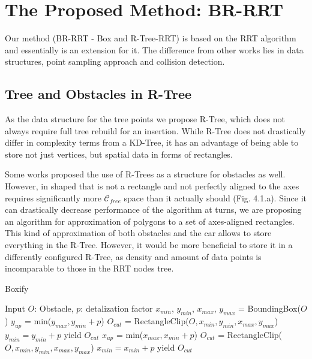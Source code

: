 \documentclass[a4paper,12pt]{article}
\DeclareRobustCommand{\[}{\begin{equation}}
\DeclareRobustCommand{\]}{\end{equation}}
\numberwithin{equation}{section}
\numberwithin{algorithm}{section}
\begin{document}
\section{The Proposed Method: BR-RRT}
Our method (BR-RRT - Box and R-Tree-RRT) is based on the RRT algorithm and essentially is an extension for it. The difference from other works lies in data structures,
point sampling approach and collision detection.

\subsection{Tree and Obstacles in R-Tree}

As the data structure for the tree points we propose R-Tree, which does not always require full tree rebuild for an insertion.
While R-Tree does not drastically differ in complexity terms from a KD-Tree, it has an advantage of being able to store not just vertices,
but spatial data in forms of rectangles.

Some works proposed the use of R-Trees as a structure for obstacles as well. However, in shaped that is not a rectangle and not perfectly aligned to the axes requires significantly
more $\mathcal{C}_{free}$ space than it actually should (Fig. 4.1.a). Since it can drastically decrease performance of the algorithm at turns, we are proposing an algorithm for
approximation of polygons to a set of axes-aligned rectangles. This kind of approximation of both obstacles and the car allows to store everything in the R-Tree. However, it would be more beneficial to store it in a differently configured R-Tree,
as density and amount of data points is incomparable to those in the RRT nodes tree.

\begin{algorithm}[H]
    \caption{Boxify}
    \begin{algorithmic}[1]
    \State Input $O$: Obstacle, $p$: detalization factor 
    \State $x_{min}$, $y_{min}$, $x_{max}$, $y_{max}$ = BoundingBox($O$)
    \State $y_{up}$ = min($y_{max}, y_{min}+p$)
    \State $O_{cut}$ = RectangleClip($O, x_{min}, y_{min}, x_{max}, y_{max}$)
    \State $y_{min} = y_{min} + p$
    \State yield $O_{cut}$
    \EndWhile
    \Else
    \State $x_{up}$ = min($x_{max}, x_{min}+p$)
    \State $O_{cut}$ = RectangleClip($O, x_{min}, y_{min}, x_{max}, y_{max}$)
    \State $x_{min} = x_{min} + p$
    \State yield $O_{cut}$
    \EndWhile
    \EndIf
    \end{algorithmic}
\end{algorithm}
\end{document}
